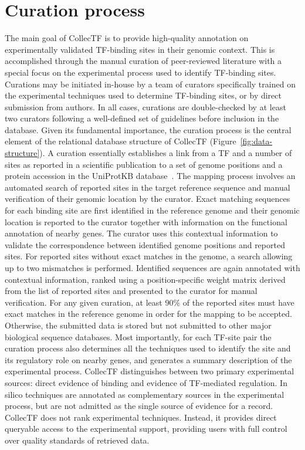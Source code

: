 \section{Curation process}


The main goal of CollecTF is to provide high-quality annotation on
experimentally validated TF-binding sites in their genomic context. This is
accomplished through the manual curation of peer-reviewed literature with a
special focus on the experimental process used to identify TF-binding
sites. Curations may be initiated in-house by a team of curators specifically
trained on the experimental techniques used to determine TF-binding sites, or
by direct submission from authors. In all cases, curations are double-checked
by at least two curators following a well-defined set of guidelines before
inclusion in the database. Given its fundamental importance, the curation
process is the central element of the relational database structure of CollecTF
(Figure~\ref{fig:data-structure}). A curation essentially establishes a link
from a TF and a number of sites as reported in a scientific publication to a
set of genome positions and a protein accession in the UniProtKB
database~\cite{uniprot2014uniprot}. The mapping process involves an automated
search of reported sites in the target reference sequence and manual
verification of their genomic location by the curator. Exact matching sequences
for each binding site are first identified in the reference genome and their
genomic location is reported to the curator together with information on the
functional annotation of nearby genes. The curator uses this contextual
information to validate the correspondence between identified genome positions
and reported sites. For reported sites without exact matches in the genome, a
search allowing up to two mismatches is performed. Identified sequences are
again annotated with contextual information, ranked using a position-specific
weight matrix derived from the list of reported sites and presented to the
curator for manual verification. For any given curation, at least 90\% of the
reported sites must have exact matches in the reference genome in order for the
mapping to be accepted. Otherwise, the submitted data is stored but not
submitted to other major biological sequence databases. Most importantly, for
each TF-site pair the curation process also determines all the techniques used
to identify the site and its regulatory role on nearby genes, and generates a
summary description of the experimental process. CollecTF distinguishes between
two primary experimental sources: direct evidence of binding and evidence of
TF-mediated regulation. In silico techniques are annotated as complementary
sources in the experimental process, but are not admitted as the single source
of evidence for a record. CollecTF does not rank experimental
techniques. Instead, it provides direct queryable access to the experimental
support, providing users with full control over quality standards of retrieved
data.


